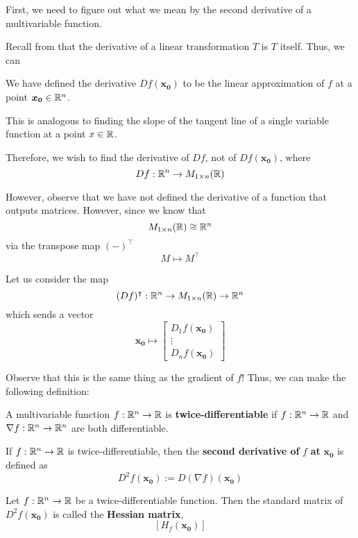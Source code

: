 First, we need to figure out what we mean by the second derivative of a multivariable function.

Recall from  that the derivative of a linear transformation $T$ is $T$ itself. Thus, we can 

\begin{remark}
    We have defined the derivative $Df(\bm{x_0})$ to be the linear approximation of $f$ \textnormal{at a point} $\bm{x_0} \in \mathbb{R}^n$.
    
    \vspace{1em}
    
    This is analogous to finding the slope of the tangent line of a single variable function \textnormal{at a point} $x \in \mathbb{R}$.
    
    \end{remark}

Therefore, we wish to find the derivative of $Df$, not of $Df(\bm{x_0})$, where 
$$Df : \mathbb{R}^n \to M_{1\times n}(\mathbb{R})$$

However, observe that we have not defined the derivative of a function that outputs matrices.  However, since we know that $$M_{1\times n}(\mathbb{R}) \cong \mathbb{R}^n$$ via the transpose map $(-)^\intercal$ 
$$M \mapsto M^\intercal$$

Let us consider the map $$(Df)^\intercal : \mathbb{R}^n \to M_{1\times n}(\mathbb{R}) \to \mathbb{R}^n$$
which sends a vector 
$$\bm{x_0} \mapsto \begin{bmatrix}
D_1f(\bm{x_0}) \\
\vdots \\
D_nf(\bm{x_0})
\end{bmatrix}$$

Observe that this is the same thing as the gradient of $f$!  Thus, we can make the following definition:

\begin{definition}
A multivariable function $f: \mathbb{R}^n \to \mathbb{R}$ is \textbf{twice-differentiable} if $f : \mathbb{R}^n \to \mathbb{R}$ and $\nabla f : \mathbb{R}^n \to \mathbb{R}^n$ are both differentiable.

\vspace{1em}

If $f: \mathbb{R}^n \to \mathbb{R}$ is twice-differentiable, then the \textbf{second derivative of} $f$ \textbf{at} $\bm{x_0}$ is defined as 
$$D^2f(\bm{x_0}) := D(\nabla f)(\bm{x_0})$$
\end{definition}

\begin{definition}
Let $f: \mathbb{R}^n \to \mathbb{R}$ be a twice-differentiable function. Then the standard matrix of $D^2f(\bm{x_0})$ is called the \textbf{Hessian matrix}, 
$$\left[H_f(\bm{x_0})\right]$$
\end{definition}

